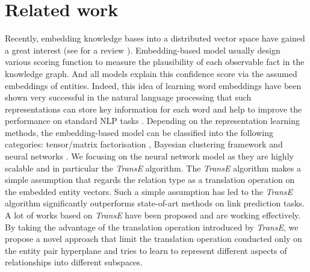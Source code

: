 \documentclass[9pt]{sig-alternate-05-2015}
\begin{document}
\section{Related work} \label{review}
Recently, embedding knowledge bases into a distributed vector space have gained a great interest (see \cite{nickel_review_2015} for a review ). Embedding-based model usually design various scoring function to measure the plausibility of each observable fact in the knowledge graph. And all models explain this confidence score via the assumed embeddings of entities. Indeed, this idea of learning word embeddings  have been shown very successful in the natural language processing that such representations can store key information for each word and help to improve the performance on standard NLP tasks \cite{bengio_neural_2006}.  Depending on the representation learning methods, the embedding-based model can be classified into the following categories: tensor/matrix factorisation \cite{singh_relational_2008} \cite{nickel_three-way_2011}, Bayesian clustering framework \cite{kemp_learning_2006} \cite{sutskever_modelling_2009} and neural networks \cite{bordes_learning_2011} \cite{jenatton_latent_2012} \cite{bordes_translating_2013} \cite{socher_reasoning_2013} \cite{bordes_semantic_2014} \cite{wang_knowledge_2014} \cite{lin_learning_2015} \cite{garcia-duran_composing_2015}. We focusing on the neural network model as they are highly scalable and in particular the \emph{TransE} \cite{bordes_translating_2013} algorithm. The \emph{TransE} algorithm makes a simple assumption that regards the relation type as a translation operation on the embedded entity vectors. Such a simple assumption has led to the \emph{TransE} algorithm significantly outperforms state-of-art methods on link prediction tasks. A lot of works \cite{fan_transition-based_2014} \cite{wang_knowledge_2014} \cite{lin_learning_2015} \cite{garcia-duran_composing_2015}  based on \emph{TransE} have been proposed and are working effectively. By taking the advantage of the translation operation introduced by \emph{TransE}, we propose a novel approach that limit the translation operation conducted only on the entity pair hyperplane and tries to learn to represent  different aspects of relationships into different subspaces.
\end{document}

